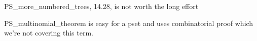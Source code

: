 \documentclass[handout]{mcs}
\begin{document}
\renewcommand{\reading}{
\begin{itemize}
\item \emph{Counting},~\bref{division_rule_sec} through~\bref{inc-ex_sec}
\item \emph{Generating functions},~\bref{generating_function_chap} through~\bref{sec:partial-fraction}
\end{itemize}
}




\begin{editingnotes}
PS_more_numbered_trees, 14.28, is not worth the long effort

PS_multinomial_theorem is easy for a pset and uses combinatorial proof
which we're not covering this term.
\end{editingnotes}




\end{document}
